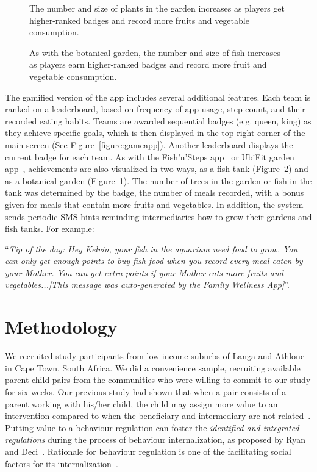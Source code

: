 \documentclass{sig-alternate}
\begin{document}
\begin{figure}[H]
\centering
{}
\caption{The number and size of plants in the garden increases as players get higher-ranked badges and record more fruits and vegetable consumption.}
\label{figure:botanical}
\end{figure}

\begin{figure}[H]
\centering
{}
\caption{As with the botanical garden, the number and size of fish increases as players earn higher-ranked badges and record more fruit and vegetable consumption.}
\label{figure:tank}
\end{figure}

The gamified version of the app includes several additional features.  Each team is ranked on a leaderboard, based on frequency of app usage, step count, and their recorded eating habits. Teams are awarded sequential badges (e.g. queen, king) as they achieve specific goals, which is then displayed in the top right corner of the main screen (See Figure~\ref{figure:gameapp}). Another leaderboard displays the current badge for each team. As with the Fish'n'Steps app~\cite{lin2006:fish} or UbiFit garden app~\cite{klasnja2009:using}, achievements are also visualized in two ways, as a fish tank (Figure~\ref{figure:tank}) and as a botanical garden (Figure~\ref{figure:botanical}). The number of trees in the garden or fish in the tank was determined by the badge, the number of meals recorded, with a bonus given for meals that contain more fruits and vegetables. In addition, the system sends periodic SMS hints reminding intermediaries how to grow their gardens and fish tanks. For example:

``\emph{Tip of the day: Hey Kelvin, your fish in the aquarium need food to grow. You can only get enough points to buy fish food when you record every meal eaten by your Mother. You can get extra points if your Mother eats more fruits and vegetables...[This message was auto-generated by the Family Wellness App]}''. 

\section{Methodology}
We recruited study participants from low-income suburbs of Langa and Athlone in Cape Town, South Africa. We did a convenience sample, recruiting available parent-child pairs from the communities who were willing to commit to our study for six weeks. Our previous study had shown that when a pair consists of a parent working with his/her child, the child may assign more value to an intervention compared to when the beneficiary and intermediary are not related~\cite{katule2016:leveraging}. Putting value to a behaviour regulation can foster the \emph{identified and integrated regulations} during the process of behaviour internalization, as proposed by Ryan and Deci~\cite{ryan2000intrinsic}. Rationale for behaviour regulation is one of the facilitating social factors for  its internalization~\cite{deci1994facilitating}. 
\end{document}
